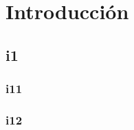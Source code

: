 \chapter{Introducción}
\thispagestyle{empty}

\section{i1}

\subsection{i11}


\newpage
\subsection{i12}
